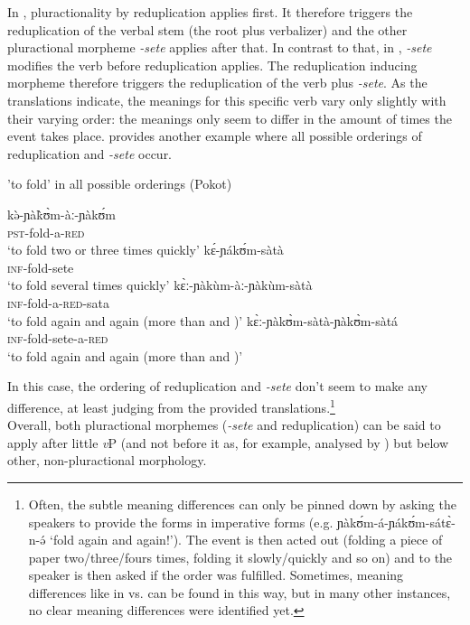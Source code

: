 \documentclass[output=paper,colorlinks,citecolor=brown
]{langscibook}
\begin{document}
\noindent In , pluractionality by reduplication applies first. It therefore triggers the reduplication of the verbal stem (the root plus verbalizer) and the other pluractional morpheme \textit{-sete} applies after that. 
In contrast to that, in , \textit{-sete} modifies the verb before reduplication applies. The reduplication inducing morpheme therefore triggers the reduplication of the verb plus \textit{-sete}. As the translations indicate, the meanings for this specific verb vary only slightly with their varying order: the meanings only seem to differ in the amount of times the event takes place.  provides another example where all possible orderings of reduplication and \textit{-sete} occur. 

\newpage
\ea 'to fold' in all possible orderings (Pokot)\label{ex:fiebig:anotherone}
\begin{xlist}
    \ex \label{ex:fiebig:anotheroneA}
    \gll kə̀-ɲàk̀ʊ̀m-àː-ɲàkʊ́m\\
    \textsc{pst}-fold-a-\textsc{red}\\
    \glt `to fold two or three times quickly' 
    \ex \label{ex:fiebig:anotheroneB}
    \gll kɛ́-ɲákʊ́m-sàtà\\
    \textsc{inf}-fold-sete\\
    \glt `to fold several times quickly'
    \ex
    \gll kɛ̀ː-ɲàkùm-àː-ɲàkùm-sàtà\\
    \textsc{inf}-fold-a-\textsc{red}-sata\\
    \glt `to fold again and again (more than  and )'
    \ex
    \gll kɛ̀ː-ɲàkʊ̀m-sàtà-ɲàkʊ̀m-sàtá\\
    \textsc{inf}-fold-sete-a-\textsc{red}\\
    \glt `to fold again and again (more than  and )'
\end{xlist}
\z

\noindent In this case, the ordering of reduplication and \textit{-sete} don't seem to make any difference, at least judging from the provided translations.\footnote{Often, the subtle meaning differences can only be pinned down by asking the speakers to provide the forms in imperative forms (e.g. ɲàkʊ́m-á-ɲákʊ́m-sátɛ̀-n-ə́ `fold again and again!'). The event is then acted out (folding a piece of paper two/three/fours times, folding it slowly/quickly and so on) and to the speaker is then asked if the order was fulfilled. Sometimes, meaning differences like in  vs.  can be found in this way, but in many other instances, no clear meaning differences were identified yet.}\\
Overall, both pluractional morphemes (\textit{-sete} and reduplication) can be said to apply after little \textit{v}P (and not before it as, for example, analysed by \citealt{Thornton2019}) but below other, non-pluractional morphology. 
\end{document}
